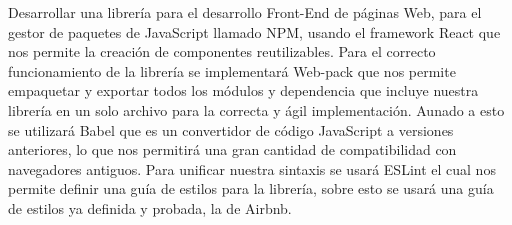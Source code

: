 Desarrollar una librería para el desarrollo Front-End de páginas Web, para el gestor de paquetes de JavaScript \cite{javascript} llamado NPM, usando el framework React que nos permite la creación de componentes reutilizables. Para el correcto funcionamiento de la librería se implementará Web-pack que nos permite empaquetar y exportar todos los módulos y dependencia que incluye nuestra librería en un solo archivo para la correcta y ágil implementación. Aunado a esto se utilizará Babel \cite{babel} que es un convertidor de código JavaScript a versiones anteriores, lo que nos permitirá una gran cantidad de compatibilidad con navegadores antiguos. Para unificar nuestra sintaxis se usará ESLint el cual nos permite definir una guía de estilos para la librería, sobre esto se usará una guía de estilos ya definida y probada, la de Airbnb. 
\newpage
